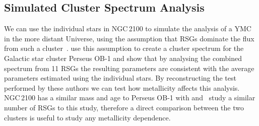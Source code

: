 \documentclass[useAMS,usenatbib]{mn2e}
\def\kms{$\mbox{km s}^{-1}$}
\begin{document}







\subsection{Simulated Cluster Spectrum Analysis} %
\label{sub:integrated_light_cluster_analysis}

We can use the individual stars in NGC\,2100 to simulate the analysis of a YMC in the more distant Universe, using the assumption that RSGs dominate the flux from such a cluster~\citep{2013MNRAS.430L..35G}.
\cite{2014ApJ...788...58G} use this assumption to create a cluster spectrum for the Galactic star cluster Perseus OB-1 and show that by analysing the combined spectrum from 11 RSGs the resulting parameters are consistent with the average parameters estimated using the individual stars.
By reconstructing the test performed by these authors we can test how metallicity affects this analysis.
NGC\,2100 has a similar mass and age to Perseus OB-1 with and~\cite{2014ApJ...788...58G} study a similar number of RSGs to this study,
therefore a direct comparison between the two clusters is useful to study any metallicity dependence.
\end{document}
